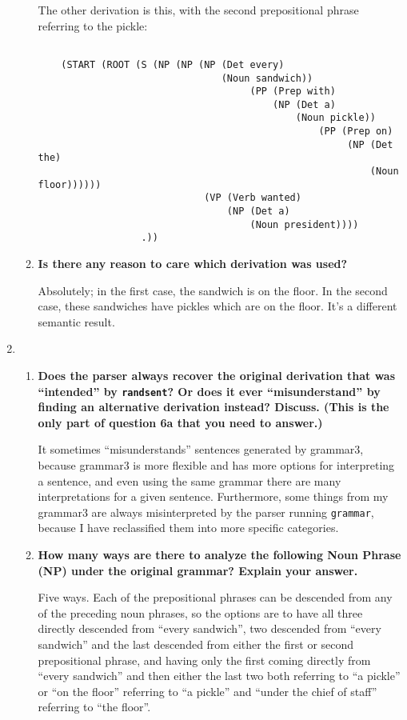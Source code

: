 \documentclass[10pt]{article}
\begin{document}
\begin{enumerate}
\begin{enumerate}
The other derivation is this, with the second prepositional phrase referring to the pickle:

\bigskip
\begin{verbatim}

    (START (ROOT (S (NP (NP (NP (Det every)
                                (Noun sandwich))
                                     (PP (Prep with)
                                         (NP (Det a)
                                             (Noun pickle))
                                                 (PP (Prep on)
                                                      (NP (Det the)
                                                          (Noun floor))))))
                             (VP (Verb wanted)
                                 (NP (Det a)
                                     (Noun president))))
                  .))
\end{verbatim}

\item {\bf Is there any reason to care which derivation was used?}

Absolutely; in the first case, the sandwich is on the floor. In the second case, these sandwiches have pickles which are on the floor. It's a different semantic result.
\end{enumerate}

\item\begin{enumerate}
 \item {\bf Does the parser
  always recover the original derivation that was ``intended'' by
  \verb|randsent|? Or does it ever ``misunderstand'' by finding an alternative
  derivation instead?  Discuss. (This is the only part of question 6a
  that you need to answer.)}
  
  It sometimes ``misunderstands'' sentences generated by grammar3, because grammar3 is more flexible and has more options for interpreting a sentence, and even using the same grammar there are many interpretations for a given sentence. Furthermore, some things from my grammar3 are always misinterpreted by the parser running \verb|grammar|, because I have reclassified them into more specific categories.

\item {\bf How many ways are there to analyze the following Noun Phrase (NP)
  under the original grammar?  Explain your answer.}
  
Five ways. Each of the prepositional phrases can be descended from any of the preceding noun phrases, so the options are to have all three directly descended from ``every sandwich'', two descended from ``every sandwich'' and the last descended from either the first or second prepositional phrase, and having only the first coming directly from ``every sandwich'' and then either the last two both referring to ``a pickle'' or ``on the floor'' referring to ``a pickle'' and ``under the chief of staff'' referring to ``the floor''.


\end{enumerate}
\end{enumerate}
\end{document}
